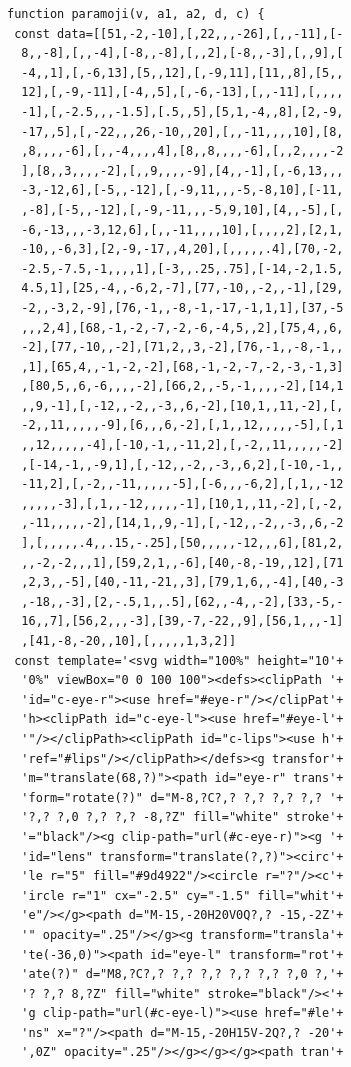 \documentclass[conference]{IEEEtran}
\begin{document}
{\small
    \begin{verbatim}
function paramoji(v, a1, a2, d, c) {
 const data=[[51,-2,-10],[,22,,,-26],[,,-11],[-
  8,,-8],[,,-4],[-8,,-8],[,,2],[-8,,-3],[,,9],[
  -4,,1],[,-6,13],[5,,12],[,-9,11],[11,,8],[5,,
  12],[,-9,-11],[-4,,5],[,-6,-13],[,,-11],[,,,,
  -1],[,-2.5,,,-1.5],[.5,,5],[5,1,-4,,8],[2,-9,
  -17,,5],[,-22,,,26,-10,,20],[,,-11,,,,10],[8,
  ,8,,,,-6],[,,-4,,,,4],[8,,8,,,,-6],[,,2,,,,-2
  ],[8,,3,,,,-2],[,,9,,,,-9],[4,,-1],[,-6,13,,,
  -3,-12,6],[-5,,-12],[,-9,11,,,-5,-8,10],[-11,
  ,-8],[-5,,-12],[,-9,-11,,,-5,9,10],[4,,-5],[,
  -6,-13,,,-3,12,6],[,,-11,,,,10],[,,,,2],[2,1,
  -10,,-6,3],[2,-9,-17,,4,20],[,,,,,.4],[70,-2,
  -2.5,-7.5,-1,,,,1],[-3,,.25,.75],[-14,-2,1.5,
  4.5,1],[25,-4,,-6,2,-7],[77,-10,,-2,,-1],[29,
  -2,,-3,2,-9],[76,-1,,-8,-1,-17,-1,1,1],[37,-5
  ,,,2,4],[68,-1,-2,-7,-2,-6,-4,5,,2],[75,4,,6,
  -2],[77,-10,,-2],[71,2,,3,-2],[76,-1,,-8,-1,,
  ,1],[65,4,,-1,-2,-2],[68,-1,-2,-7,-2,-3,-1,3]
  ,[80,5,,6,-6,,,,-2],[66,2,,-5,-1,,,,-2],[14,1
  ,,9,-1],[,-12,,-2,,-3,,6,-2],[10,1,,11,-2],[,
  -2,,11,,,,,-9],[6,,,6,-2],[,1,,12,,,,,-5],[,1
  ,,12,,,,,-4],[-10,-1,,-11,2],[,-2,,11,,,,,-2]
  ,[-14,-1,,-9,1],[,-12,,-2,,-3,,6,2],[-10,-1,,
  -11,2],[,-2,,-11,,,,,-5],[-6,,,-6,2],[,1,,-12
  ,,,,,-3],[,1,,-12,,,,,-1],[10,1,,11,-2],[,-2,
  ,-11,,,,,-2],[14,1,,9,-1],[,-12,,-2,,-3,,6,-2
  ],[,,,,,.4,,.15,-.25],[50,,,,,-12,,,6],[81,2,
  ,,-2,-2,,,1],[59,2,1,,-6],[40,-8,-19,,12],[71
  ,2,3,,-5],[40,-11,-21,,3],[79,1,6,,-4],[40,-3
  ,-18,,-3],[2,-.5,1,,.5],[62,,-4,,-2],[33,-5,-
  16,,7],[56,2,,,-3],[39,-7,-22,,9],[56,1,,,-1]
  ,[41,-8,-20,,10],[,,,,,1,3,2]]
 const template='<svg width="100%" height="10'+
  '0%" viewBox="0 0 100 100"><defs><clipPath '+
  'id="c-eye-r"><use href="#eye-r"/></clipPat'+
  'h><clipPath id="c-eye-l"><use href="#eye-l'+
  '"/></clipPath><clipPath id="c-lips"><use h'+
  'ref="#lips"/></clipPath></defs><g transfor'+
  'm="translate(68,?)"><path id="eye-r" trans'+
  'form="rotate(?)" d="M-8,?C?,? ?,? ?,? ?,? '+
  '?,? ?,0 ?,? ?,? -8,?Z" fill="white" stroke'+
  '="black"/><g clip-path="url(#c-eye-r)"><g '+
  'id="lens" transform="translate(?,?)"><circ'+
  'le r="5" fill="#9d4922"/><circle r="?"/><c'+
  'ircle r="1" cx="-2.5" cy="-1.5" fill="whit'+
  'e"/></g><path d="M-15,-20H20V0Q?,? -15,-2Z'+
  '" opacity=".25"/></g><g transform="transla'+
  'te(-36,0)"><path id="eye-l" transform="rot'+
  'ate(?)" d="M8,?C?,? ?,? ?,? ?,? ?,? ?,0 ?,'+
  '? ?,? 8,?Z" fill="white" stroke="black"/><'+
  'g clip-path="url(#c-eye-l)"><use href="#le'+
  'ns" x="?"/><path d="M-15,-20H15V-2Q?,? -20'+
  ',0Z" opacity=".25"/></g></g></g><path tran'+

\end{verbatim}}
\end{document}

